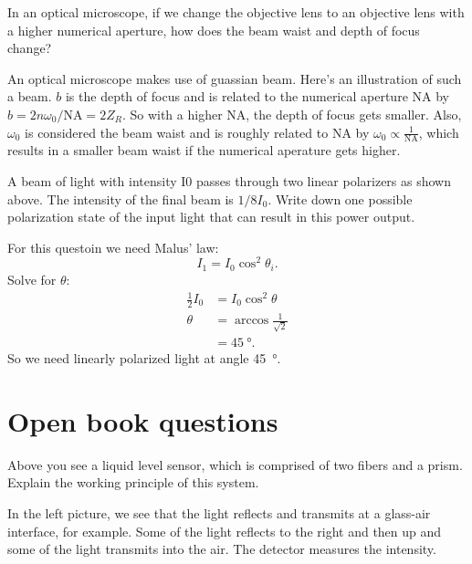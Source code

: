 \documentclass[answers, addpoints]{exam} %
\begin{document}
\begin{questions}
	\question[5] In an optical microscope, if we change the objective lens to an objective lens with a higher numerical aperture, how does the beam waist and depth of focus change?
	\begin{solution}
		An optical microscope makes use of guassian beam.
		Here's an illustration of such a beam.
		$b$ is the depth of focus and is related to the numerical aperture $\mathrm{NA}$ by $b=2 n \omega_0 / \mathrm{NA} = 2 Z_R$.
		So with a higher $\mathrm{NA}$, the depth of focus gets smaller.
		Also, $\omega_0$ is considered the beam waist and is roughly related to $\mathrm{NA}$ by $\omega_0 \propto \frac{1}{\mathrm{NA}}$, which results in a smaller beam waist if the numerical aperature gets higher.
	\end{solution}
		
	\question[5] A beam of light with intensity I0 passes through two linear polarizers as shown above. The intensity of the final beam is $1/8 I_0$.
	Write down one possible polarization state of the input light that can result in this power output.
	\begin{solution}
		For this questoin we need Malus' law:
		\begin{displaymath}
			I_1 = I_0 \cos^2\theta_i.
		\end{displaymath}
		Solve for $\theta$:
		\begin{align*}
			\frac{1}{2}I_0 &= I_0 \cos^2\theta \\
			\theta &= \arccos\frac{1}{\sqrt{2}} \\
			&= \SI{45}{\degree}.
		\end{align*}	
		So we need linearly polarized light at angle \SI{45}{\degree}.
	\end{solution}
	
\part{Open book questions}
\setcounter{question}{0}

\question[10] Above you see a liquid level sensor, which is comprised of two fibers and a prism.
Explain the working principle of this system.
\begin{solution}
	In the left picture, we see that the light reflects and transmits at a glass-air interface, for example.
	Some of the light reflects to the right and then up and some of the light transmits into the air.
	The detector measures the intensity.
	

\end{solution}
\end{questions}
\end{document}
